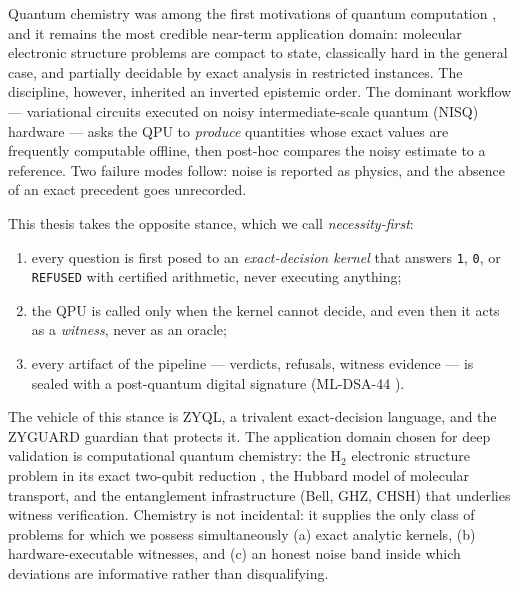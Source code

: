 \documentclass[11pt,a4paper]{report}
\begin{document}
Quantum chemistry was among the first motivations of quantum computation
\citep{feynman1982}, and it remains the most credible near-term application
domain: molecular electronic structure problems are compact to state,
classically hard in the general case, and partially decidable by exact
analysis in restricted instances. The discipline, however, inherited an
inverted epistemic order. The dominant workflow --- variational circuits
executed on noisy intermediate-scale quantum (NISQ) hardware
\citep{preskill2018} --- asks the QPU to \emph{produce} quantities whose
exact values are frequently computable offline, then post-hoc compares the
noisy estimate to a reference. Two failure modes follow: noise is reported
as physics, and the absence of an exact precedent goes unrecorded.

This thesis takes the opposite stance, which we call \emph{necessity-first}:
\begin{enumerate}
  \item every question is first posed to an \emph{exact-decision kernel}
        that answers \texttt{1}, \texttt{0}, or \texttt{REFUSED} with
        certified arithmetic, never executing anything;
  \item the QPU is called only when the kernel cannot decide, and even
        then it acts as a \emph{witness}, never as an oracle;
  \item every artifact of the pipeline --- verdicts, refusals, witness
        evidence --- is sealed with a post-quantum digital signature
        (ML-DSA-44 \citep{fips204}).
\end{enumerate}

The vehicle of this stance is ZYQL, a trivalent exact-decision language,
and the ZYGUARD guardian that protects it. The application domain chosen
for deep validation is computational quantum chemistry: the H$_2$
electronic structure problem in its exact two-qubit reduction
\citep{omalley2016}, the Hubbard model of molecular transport, and the
entanglement infrastructure (Bell, GHZ, CHSH) that underlies witness
verification. Chemistry is not incidental: it supplies the only class of
problems for which we possess simultaneously (a) exact analytic kernels,
(b) hardware-executable witnesses, and (c) an honest noise band inside
which deviations are informative rather than disqualifying.
\end{document}
